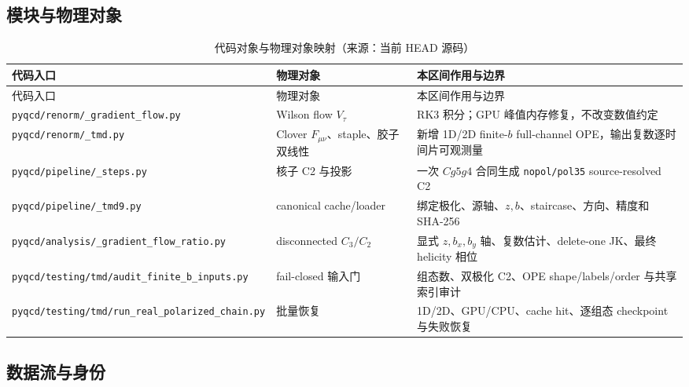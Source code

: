 \documentclass[UTF8]{ctexart}
\newcommand{\pathref}[1]{\texttt{\nolinkurl{#1}}}
\begin{document}
\subsection{模块与物理对象}

\begin{xltabular}{\textwidth}{@{}p{0.30\textwidth}p{0.30\textwidth}X@{}}
\caption{代码对象与物理对象映射（来源：当前 HEAD 源码）}\\
\toprule
代码入口 & 物理对象 & 本区间作用与边界 \\
\midrule
\endfirsthead
\toprule
代码入口 & 物理对象 & 本区间作用与边界 \\
\midrule
\endhead
\pathref{pyqcd/renorm/_gradient_flow.py} & Wilson flow \(V_\tau\) & RK3 积分；GPU 峰值内存修复，不改变数值约定 \\
\pathref{pyqcd/renorm/_tmd.py} & Clover \(F_{\mu\nu}\)、staple、胶子双线性 & 新增 1D/2D finite-\(b\) full-channel OPE，输出复数逐时间片可观测量 \\
\pathref{pyqcd/pipeline/_steps.py} & 核子 C2 与投影 & 一次 \(Cg5g4\) 合同生成 \texttt{nopol/pol35} source-resolved C2 \\
\pathref{pyqcd/pipeline/_tmd9.py} & canonical cache/loader & 绑定极化、源轴、\(z,b\)、staircase、方向、精度和 SHA-256 \\
\pathref{pyqcd/analysis/_gradient_flow_ratio.py} & disconnected \(C_3/C_2\) & 显式 \(z,b_x,b_y\) 轴、复数估计、delete-one JK、最终 helicity 相位 \\
\pathref{pyqcd/testing/tmd/audit_finite_b_inputs.py} & fail-closed 输入门 & 组态数、双极化 C2、OPE shape/labels/order 与共享索引审计 \\
\pathref{pyqcd/testing/tmd/run_real_polarized_chain.py} & 批量恢复 & 1D/2D、GPU/CPU、cache hit、逐组态 checkpoint 与失败恢复 \\
\bottomrule
\end{xltabular}

\subsection{数据流与身份}
\end{document}
